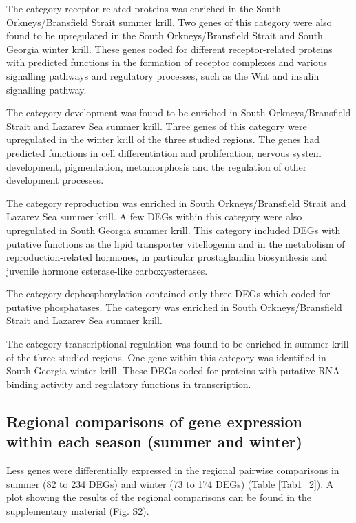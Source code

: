 The category receptor-related proteins was enriched in the South
Ork\-neys/Brans\-field Strait summer krill. Two genes of this category were also
found to be upregulated in the South Orkneys/Bransfield Strait and South
Georgia winter krill. These genes coded for different receptor-related proteins
with predicted functions in the formation of receptor complexes and various
signalling pathways and regulatory processes, such as the Wnt and insulin
signalling pathway.

The category development was found to be enriched in South Orkneys/Bransfield
Strait and Lazarev Sea summer krill. Three genes of this category were
upregulated in the winter krill of the three studied regions. The genes had
predicted functions in cell differentiation and proliferation, nervous system
development, pigmentation, metamorphosis and the regulation of other
development processes.

The category reproduction was enriched in South Orkneys/Bransfield Strait and
Lazarev Sea summer krill. A few DEGs within this category were also upregulated
in South Georgia summer krill. This category included DEGs with putative
functions as the lipid transporter vitellogenin and in the metabolism of
reproduction-related hormones, in particular prostaglandin biosynthesis and
juvenile hormone esterase-like carboxyesterases.

The category dephosphorylation contained only three DEGs which coded for
putative phosphatases. The category was enriched in South Orkneys/Bransfield
Strait and Lazarev Sea summer krill.

The category transcriptional regulation was found to be enriched in summer
krill of the three studied regions. One gene within this category was
identified in South Georgia winter krill. These DEGs coded for proteins with
putative RNA binding activity and regulatory functions in transcription.

\subsection{Regional comparisons of gene expression within each season (summer and winter)}

Less genes were differentially expressed in the regional pairwise comparisons
in summer (82 to 234 DEGs) and winter (73 to 174 DEGs) (Table \ref{Tab1_2}). A
plot showing the results of the regional comparisons can be found in the
supplementary material (Fig. S2).

